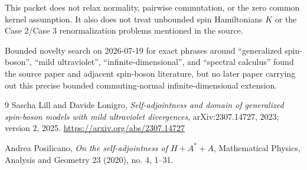 \documentclass[11pt]{article}
\begin{document}
This packet does not relax normality, pairwise commutation, or the zero common
kernel assumption. It also does not treat unbounded spin Hamiltonians $K$ or
the Case 2/Case 3 renormalization problems mentioned in the source.

Bounded novelty search on 2026-07-19 for exact phrases around
``generalized spin-boson'', ``mild ultraviolet'', ``infinite-dimensional'', and
``spectral calculus'' found the source paper and adjacent spin-boson literature,
but no later paper carrying out this precise bounded commuting-normal
infinite-dimensional extension.

\begin{thebibliography}{9}
Sascha Lill and Davide Lonigro,
\emph{Self-adjointness and domain of generalized spin-boson models with mild
ultraviolet divergences},
arXiv:2307.14727, 2023; version 2, 2025.
\url{https://arxiv.org/abs/2307.14727}

Andrea Posilicano,
\emph{On the self-adjointness of $H+A^*+A$},
Mathematical Physics, Analysis and Geometry 23 (2020), no. 4, 1--31.
\end{thebibliography}
\end{document}
